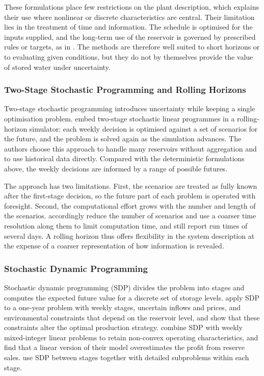 These formulations place few restrictions on the plant description,
which explains their use where nonlinear or discrete characteristics are
central. Their limitation lies in the treatment of time and information.
The schedule is optimised for the inputs supplied, and the long-term use
of the reservoir is governed by prescribed rules or targets, as in
\citet{ak2019quantifying}. The methods are therefore well suited to
short horizons or to evaluating given conditions, but they do not by
themselves provide the value of stored water under uncertainty.

\subsubsection{Two-Stage Stochastic Programming and Rolling Horizons}

Two-stage stochastic programming introduces uncertainty while keeping a
single optimisation problem. \citet{helseth2017} embed two-stage
stochastic linear programmes in a rolling-horizon simulator: each weekly
decision is optimised against a set of scenarios for the future, and the
problem is solved again as the simulation advances. The authors choose
this approach to handle many reservoirs without aggregation and to use
historical data directly. Compared with the deterministic formulations
above, the weekly decisions are informed by a range of possible futures.

The approach has two limitations. First, the scenarios are treated as
fully known after the first-stage decision, so the future part of each
problem is operated with foresight. Second, the computational effort
grows with the number and length of the scenarios.
\citet{helseth2017} accordingly reduce the number of scenarios and use a
coarser time resolution along them to limit computation time, and still
report run times of several days. A rolling horizon thus offers
flexibility in the system description at the expense of a coarser
representation of how information is revealed.

\subsubsection{Stochastic Dynamic Programming}

Stochastic dynamic programming (SDP) divides the problem into stages and
computes the expected future value for a discrete set of storage levels.
\citet{alic2023optimal} apply SDP to a one-year problem with weekly
stages, uncertain inflows and prices, and environmental constraints that
depend on the reservoir level, and show that these constraints alter the
optimal production strategy. \citet{helseth2017iet} combine SDP with
weekly mixed-integer linear problems to retain non-convex operating
characteristics, and find that a linear version of their model
overestimates the profit from reserve sales. \citet{abgottspon2014} use
SDP between stages together with detailed subproblems within each stage.

